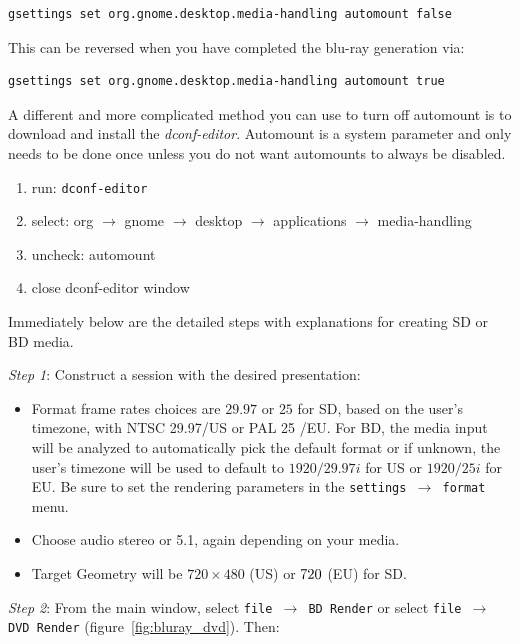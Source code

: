 \begin{lstlisting}[language=bash]
gsettings set org.gnome.desktop.media-handling automount false
\end{lstlisting}

This can be reversed when you have completed the blu-ray generation via:

\begin{lstlisting}[language=bash]
gsettings set org.gnome.desktop.media-handling automount true
\end{lstlisting}

A different and more complicated method you can use to turn off automount is to download and install the \textit{dconf-editor}.  Automount is a system parameter and only needs to be done once unless you do not want automounts to always be disabled.

\begin{enumerate}
    \item run: \texttt{dconf-editor}
    \item select: org $\rightarrow$ gnome $\rightarrow$ desktop $\rightarrow$ applications $\rightarrow$ media-handling
    \item uncheck: automount
    \item close dconf-editor window
\end{enumerate}

Immediately below are the detailed steps with explanations for creating SD or BD media.

\textit{Step 1}: Construct a session with the desired presentation:

\begin{itemize}
    \item Format frame rates choices are $29.97$ or $25$ for SD, based on the user's timezone, with NTSC 29.97/US or PAL 25 /EU.  For BD, the media input will be analyzed to automatically pick the default format or if unknown, the user's timezone will be used to default to $1920/29.97i$ for US or $1920/25i$ for EU.  Be sure to set the rendering parameters in the \texttt{settings $\rightarrow$ format} menu.
    \item Choose audio stereo or 5.1, again depending on your media.
    \item Target Geometry will be $720\times480$ (US) or $720\time576$ (EU) for SD.
\end{itemize}

\textit{Step 2}: From the main window, select  \texttt{file $\rightarrow$ BD Render}   or    select  \texttt{file $\rightarrow$ DVD Render} (figure~\ref{fig:bluray_dvd}).  Then:

